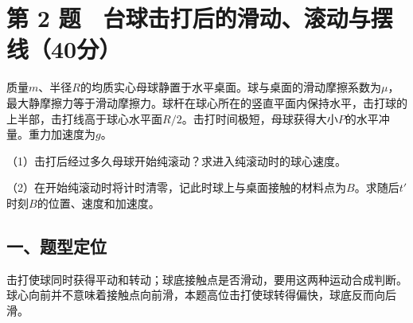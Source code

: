 \documentclass[12pt,a4paper,fontset=fandol]{ctexart}
\begin{document}
\clearpage

\section{第 2
题　台球击打后的滑动、滚动与摆线（40分）}\label{ux7b2c-2-ux9898-ux53f0ux7403ux51fbux6253ux540eux7684ux6ed1ux52a8ux6edaux52a8ux4e0eux6446ux7ebf40ux5206}

质量\(m\)、半径\(R\)的均质实心母球静置于水平桌面。球与桌面的滑动摩擦系数为\(\mu\)，最大静摩擦力等于滑动摩擦力。球杆在球心所在的竖直平面内保持水平，击打球的上半部，击打线高于球心水平面\(R/2\)。击打时间极短，母球获得大小\(P\)的水平冲量。重力加速度为\(g\)。

\begin{center}
\begin{minipage}{\linewidth}
\centering\begingroup{}
\ifdim\wd\diagrambox>.88\linewidth
\sbox{\diagrambox}{\resizebox{.88\linewidth}{!}{\usebox{\diagrambox}}}\fi
\ifdim\ht\diagrambox>.38\textheight
\resizebox{!}{.38\textheight}{\usebox{\diagrambox}}
\else\usebox{\diagrambox}\fi
\par{}\endgroup\end{minipage}\end{center}

（1）击打后经过多久母球开始纯滚动？求进入纯滚动时的球心速度。

（2）在开始纯滚动时将计时清零，记此时球上与桌面接触的材料点为\(B\)。求随后\(t'\)时刻\(B\)的位置、速度和加速度。

\subsection{一、题型定位}\label{ux4e00ux9898ux578bux5b9aux4f4d-1}

击打使球同时获得平动和转动；球底接触点是否滑动，要用这两种运动合成判断。球心向前并不意味着接触点向前滑，本题高位击打使球转得偏快，球底反而向后滑。
\end{document}
